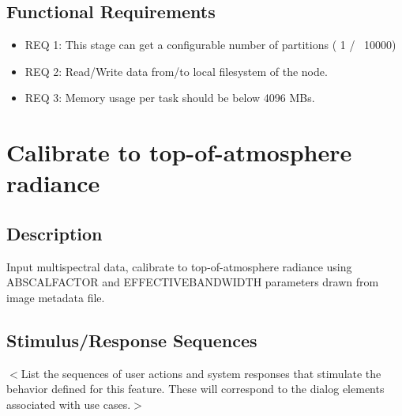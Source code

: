 \documentclass{scrreprt}
\begin{document}
\subsection{Functional Requirements}

\begin{itemize}
	\item REQ 1: This stage can get a configurable number of partitions ( 1 /~ 10000)
	\item REQ 2: Read/Write data from/to local filesystem of the node.
	\item REQ 3: Memory usage per task should be below 4096 MBs.
\end{itemize}

\iffalse
\section{Calibrate to top-of-atmosphere radiance}
\subsection{Description}

Input multispectral data, calibrate to top-of-atmosphere radiance using ABSCALFACTOR and EFFECTIVEBANDWIDTH parameters 
drawn from image metadata file. 

\subsection{Stimulus/Response Sequences}
$<$List the sequences of user actions and system responses that stimulate the 
behavior defined for this feature. These will correspond to the dialog elements 
associated with use cases.$>$
\end{document}
